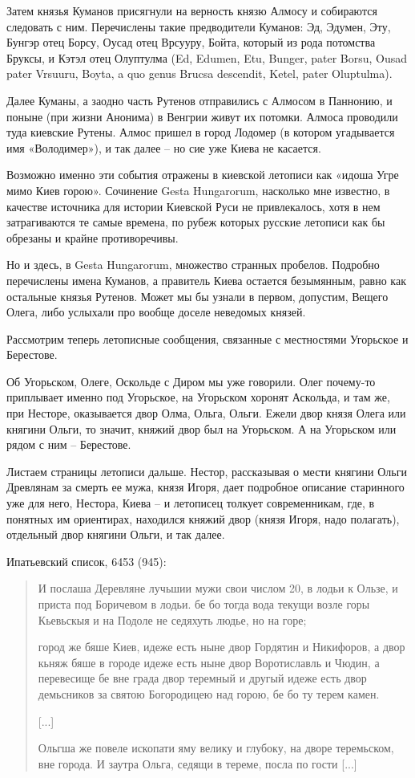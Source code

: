 Затем князья Куманов присягнули на верность князю Алмосу и собираются следовать с ним. Перечислены такие предводители Куманов: Эд, Эдумен, Эту, Бунгэр отец Борсу, Оусад отец Врсууру, Бойта, который из рода потомства Бруксы, и Кэтэл отец Олуптулма (Ed, Edumen, Etu, Bunger, pater Borsu, Ousad pater Vrsuuru, Boyta, a quo genus Brucsa descendit, Ketel, pater Oluptulma).

Далее Куманы, а заодно часть Рутенов отправились с Алмосом в Паннонию, и поныне (при жизни Анонима) в Венгрии живут их потомки. Алмоса проводили туда киевские Рутены. Алмос пришел в город Лодомер (в котором угадывается имя «Володимер»), и так 
далее – но сие уже Киева не касается. 

Возможно именно эти события отражены в киевской летописи как «идоша Угре мимо Киев горою». Сочинение Gesta Hungarorum, насколько мне известно, в качестве источника для истории Киевской Руси не привлекалось, хотя в нем затрагиваются те самые времена, по рубеж которых русские летописи как бы обрезаны и крайне противоречивы.

Но и здесь, в Gesta Hungarorum, множество странных пробелов. Подробно перечислены имена Куманов, а правитель Киева остается безымянным, равно как остальные князья Рутенов. Может мы бы узнали в первом, допустим, Вещего Олега, либо услыхали про вообще доселе неведомых князей.

Рассмотрим теперь летописные сообщения, связанные с местностями Угорьское и Берестове.

Об Угорьском, Олеге, Оскольде с Диром мы уже говорили. Олег почему-то приплывает именно под Угорьское, на Угорьском хоронят Аскольда, и там же, при Несторе, оказывается двор Олма, Ольга, Ольги. Ежели двор князя Олега или княгини Ольги, то значит, княжий двор был на Угорьском. А на Угорьском или рядом с ним – Берестове.

Листаем страницы летописи дальше. Нестор, рассказывая о мести княгини Ольги Древлянам за смерть ее мужа, князя Игоря, дает подробное описание старинного уже для него, Нестора, Киева – и летописец толкует современникам, где, в понятных им ориентирах, находился княжий двор (князя Игоря, надо полагать), отдельный двор княгини Ольги, и так далее.

Ипатьевский список, 6453 (945):

\begin{quotation}
И послаша Деревляне лучьшии мужи свои числом 20, в лодьи к Ользе, и приста под Боричевом в лодьи. бе бо тогда вода текущи возле горы Кьевьскыя и на Подоле не седяхуть людье, но на горе;

город же бяше Киев, идеже есть ныне двор Гордятин и Никифоров, а двор кьняж бяше в городе идеже есть ныне двор Воротиславль и Чюдин, а перевесище бе вне града двор теремный и другый идеже есть двор демьсников за святою Богородицею над горою, бе бо ту терем камен.

[...]

Ольгша же повеле ископати яму велику и глубоку, на дворе теремьском, вне города. И заутра Ольга, седящи в тереме, посла по гости [...]
\end{quotation}


